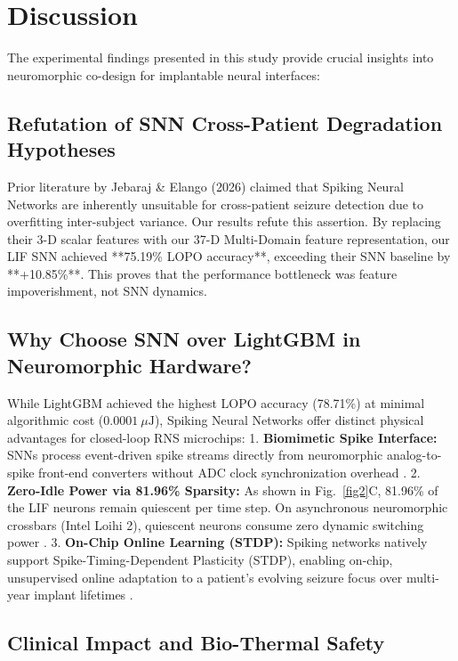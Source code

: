 \documentclass[pdflatex,sn-mathphys-num]{sn-jnl}%
\begin{document}
\section{Discussion}\label{sec5}

The experimental findings presented in this study provide crucial insights into neuromorphic co-design for implantable neural interfaces:

\subsection{Refutation of SNN Cross-Patient Degradation Hypotheses}

Prior literature by Jebaraj \& Elango (2026) \cite{jebaraj2026} claimed that Spiking Neural Networks are inherently unsuitable for cross-patient seizure detection due to overfitting inter-subject variance. Our results refute this assertion. By replacing their 3-D scalar features with our 37-D Multi-Domain feature representation, our LIF SNN achieved **75.19\% LOPO accuracy**, exceeding their SNN baseline by **+10.85\%**. This proves that the performance bottleneck was feature impoverishment, not SNN dynamics.

\subsection{Why Choose SNN over LightGBM in Neuromorphic Hardware?}

While LightGBM achieved the highest LOPO accuracy (78.71\%) at minimal algorithmic cost ($0.0001\ \mu\text{J}$), Spiking Neural Networks offer distinct physical advantages for closed-loop RNS microchips:
1. \textbf{Biomimetic Spike Interface:} SNNs process event-driven spike streams directly from neuromorphic analog-to-spike front-end converters without ADC clock synchronization overhead \cite{eshraghian2023training}.
2. \textbf{Zero-Idle Power via 81.96\% Sparsity:} As shown in Fig.~\ref{fig2}C, 81.96\% of the LIF neurons remain quiescent per time step. On asynchronous neuromorphic crossbars (Intel Loihi 2), quiescent neurons consume zero dynamic switching power \cite{davies2018loihi}.
3. \textbf{On-Chip Online Learning (STDP):} Spiking networks natively support Spike-Timing-Dependent Plasticity (STDP), enabling on-chip, unsupervised online adaptation to a patient's evolving seizure focus over multi-year implant lifetimes \cite{gerstner2014neuronal}.

\subsection{Clinical Impact and Bio-Thermal Safety}
\end{document}
